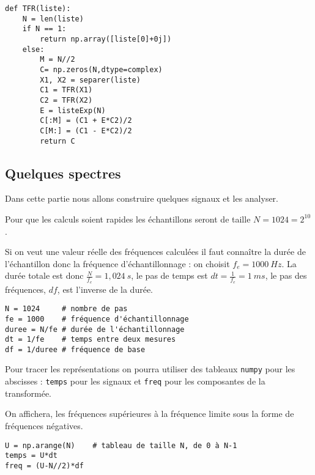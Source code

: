 \begin{Answer}
\begin{lstlisting}
def TFR(liste):
    N = len(liste)
    if N == 1:
        return np.array([liste[0]+0j])
    else:
        M = N//2
        C= np.zeros(N,dtype=complex)
        X1, X2 = separer(liste)
        C1 = TFR(X1)
        C2 = TFR(X2)
        E = listeExp(N)
        C[:M] = (C1 + E*C2)/2
        C[M:] = (C1 - E*C2)/2
        return C
\end{lstlisting}
\end{Answer}
\subsection{Quelques spectres}
Dans cette partie nous allons construire quelques signaux et les analyser.

Pour que les calculs soient rapides les échantillons seront de taille $N = 1024 = 2^{10}$.

Si on veut une valeur réelle des fréquences calculées il faut connaître la durée de l'échantillon donc la fréquence d'échantillonnage : on choisit $f_e = 1000\ Hz$. La durée totale est donc $\frac N{f_e}=1,024\ s$, le pas de temps est $dt = \frac 1{f_e}=1\ ms$, le pas des fréquences, $df$, est l'inverse de la durée.

\begin{lstlisting}
N = 1024     # nombre de pas
fe = 1000    # fréquence d'échantillonnage
duree = N/fe # durée de l'échantillonnage
dt = 1/fe    # temps entre deux mesures
df = 1/duree # fréquence de base
\end{lstlisting}

\newpage

Pour tracer les représentations on pourra utiliser des tableaux {\tt numpy} pour les abscisses : {\tt temps} pour les signaux et {\tt freq} pour les composantes de la transformée.

On affichera, les fréquences supérieures à la fréquence limite sous la forme de fréquences négatives.
\begin{lstlisting}
U = np.arange(N)    # tableau de taille N, de 0 à N-1
temps = U*dt
freq = (U-N//2)*df
\end{lstlisting}

